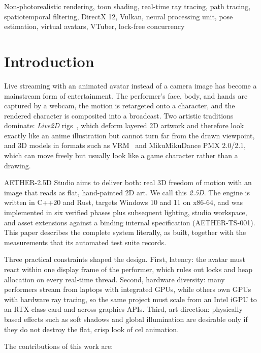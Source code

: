 \documentclass[conference]{IEEEtran}
\begin{document}
\begin{IEEEkeywords}
Non-photorealistic rendering, toon shading, real-time ray tracing, path tracing, spatiotemporal filtering, DirectX 12, Vulkan, neural processing unit, pose estimation, virtual avatars, VTuber, lock-free concurrency
\end{IEEEkeywords}


\section{Introduction}
Live streaming with an animated avatar instead of a camera image has become a mainstream form of entertainment. The performer's face, body, and hands are captured by a webcam, the motion is retargeted onto a character, and the rendered character is composited into a broadcast. Two artistic traditions dominate: \textit{Live2D} rigs~\cite{live2d}, which deform layered 2D artwork and therefore look exactly like an anime illustration but cannot turn far from the drawn viewpoint, and 3D models in formats such as VRM~\cite{vrm} and MikuMikuDance PMX 2.0/2.1, which can move freely but usually look like a game character rather than a drawing.

AETHER-2.5D Studio aims to deliver both: real 3D freedom of motion with an image that reads as flat, hand-painted 2D art. We call this \textit{2.5D}. The engine is written in C++20 and Rust, targets Windows 10 and 11 on x86-64, and was implemented in six verified phases plus subsequent lighting, studio workspace, and asset extensions against a binding internal specification (AETHER-TS-001). This paper describes the complete system literally, as built, together with the measurements that its automated test suite records.

Three practical constraints shaped the design. First, latency: the avatar must react within one display frame of the performer, which rules out locks and heap allocation on every real-time thread. Second, hardware diversity: many performers stream from laptops with integrated GPUs, while others own GPUs with hardware ray tracing, so the same project must scale from an Intel iGPU to an RTX-class card and across graphics APIs. Third, art direction: physically based effects such as soft shadows and global illumination are desirable only if they do not destroy the flat, crisp look of cel animation.

The contributions of this work are:
\end{document}
